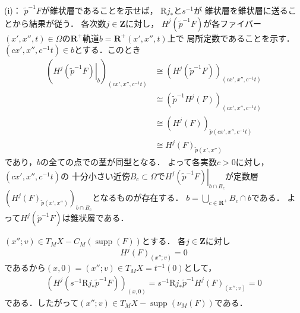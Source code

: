 \documentclass[uplatex,dvipdfmx,a4paper,10pt,draft]{jsarticle}
\makeatletter
\theoremstyle{definition}
\newcommand{\zz}{\mathbf{Z}}
\newcommand{\rr}{\mathbf{R}}
\renewenvironment{proof}[1][\proofname]{\par
  \pushQED{\qed}%
  \normalfont \topsep6\p@\@plus6\p@\relax
  \trivlist
  \item[\hskip\labelsep
         \bfseries
    {#1}]\ignorespaces
}{%
  \popQED\endtrivlist\@endpefalse
}
\renewcommand{\proofname}{証明.}
\numberwithin{equation}{section}
\newcommand{\supp}{\mathop{\mathrm{supp}}\nolimits}
\newcommand{\Rder}{\mathrm{R}}
\newcommand{\mres}[2][]{{\left.{#1}\right\rvert}_{#2}}
\theoremstyle{mystyle}
\makeatother
\begin{document}
\begin{proof}
    (i)：
    \(\tilde{p}^{-1}F\)が錐状層であることを示せば，
    \(\Rder{j}_{\ast}\)と\(s^{-1}\)が
    錐状層を錐状層に送ることから結果が従う．
    各次数\(j\in \zz\)に対し，
    \(H^{j}(\tilde{p}^{-1}F)\)が各ファイバー\(
        (x',x'',t)\in \varOmega
    \)の\(\rr^{+}\)軌道\(b=\rr^{+}(x',x'',t)\)上で
    局所定数であることを示す．
    \((cx',x'',c^{-1}t)\in b\)とする．このとき
    \begin{align*}
        \left(
            \mres[H^{j}(\tilde{p}^{-1}F)]{b}
        \right)_{(cx',x'',c^{-1}t)}
        &\cong
        \left(
            H^{j}(\tilde{p}^{-1}F)
        \right)_{(cx',x'',c^{-1}t)}\\
        &\cong
        \left(
            \tilde{p}^{-1}H^{j}(F)
        \right)_{(cx',x'',c^{-1}t)}\\
        &\cong
        \left(
            H^{j}(F)
        \right)_{\tilde{p}(cx',x'',c^{-1}t)}\\
        &\cong
        H^{j}(F)_{\tilde{p}(x',x'')}
    \end{align*}
    であり，\(b\)の全ての点での茎が同型となる．
    よって各実数\(c>0\)に対し，\((cx',x'',c^{-1}t)\)の
    十分小さい近傍\(B_c\subset \varOmega\)で\(
        \mres[H^{j}(\tilde{p}^{-1}F)]{b\cap B_c}
    \)が定数層\(\left(
        H^{j}(F)_{\tilde{p}(x',x'')}
    \right)_{b\cap B_c}\)となるものが存在する．
    \(b=\bigcup_{c\in\rr^+}B_{c}\cap b\)である．
    よって\(H^{j}(\tilde{p}^{-1}F)\)は錐状層である．

    \((x'';v)\in T_{M}X-{C_{M}(\supp(F))}\)とする．
    各\(j\in\zz\)に対し
    \[
        H^{j}(F)_{(x'';v)}=0
    \]
    であるから\((x,0)=(x'';v)\in T_{M}X=t^{-1}(0)\)として，
    \begin{align*}
        \left(
            H^{j}(s^{-1}\Rder{j}_{\ast}\tilde{p}^{-1}F)
        \right)_{(x,0)}
        =s^{-1}\Rder{j}_{\ast}\tilde{p}^{-1}H^{j}(F)_{(x'';v)}
        =0
    \end{align*}
    である．したがって\((x'';v)\in T_{M}X-\supp(\nu_{M}(F))\)である．


\end{proof}
\end{document}
